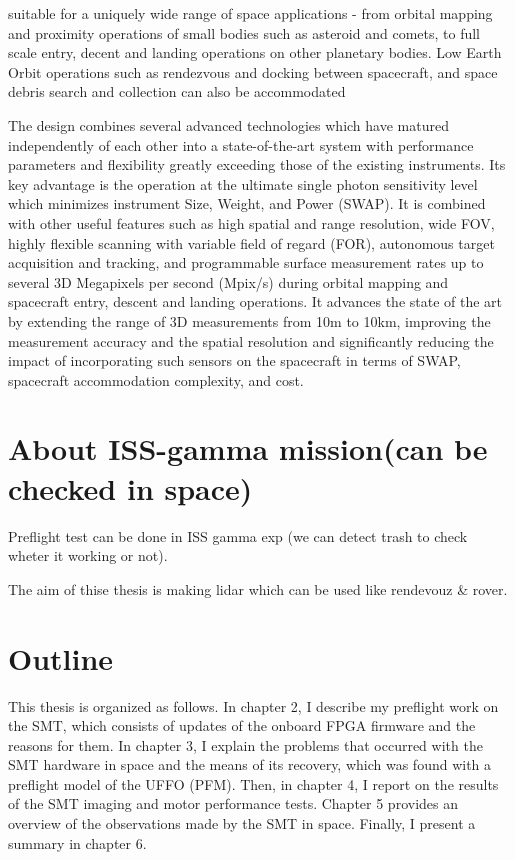 suitable for a uniquely wide range of space applications - from orbital mapping and proximity operations of small bodies such as asteroid and comets, to full scale entry, decent and landing operations on other planetary bodies. Low Earth Orbit operations such as rendezvous and docking between spacecraft, and space debris search and collection can also be accommodated

The design combines several advanced technologies which have matured independently of each other into a state-of-the-art system with performance parameters and flexibility greatly exceeding those of the existing instruments. Its key advantage is the operation at the ultimate single photon sensitivity level which minimizes instrument Size, Weight, and Power (SWAP). It is combined with other useful features such as high spatial and range resolution, wide FOV, highly flexible scanning with variable field of regard (FOR), autonomous target acquisition and tracking, and programmable surface measurement rates up to several 3D Megapixels per second (Mpix/s) during orbital mapping and spacecraft entry, descent and landing operations. It advances the state of the art by extending the range of 3D measurements from 10m to 10km, improving the measurement accuracy and the spatial resolution and significantly reducing the impact of incorporating such sensors on the spacecraft in terms of SWAP, spacecraft accommodation complexity, and cost.




\section{About ISS-gamma mission(can be checked in space)}
Preflight test can be done in ISS gamma exp (we can detect trash to check wheter it working or not).

The aim of thise thesis is making lidar which can be used like rendevouz \& rover.

\section{Outline}
This thesis is organized as follows. In chapter 2, I describe my preflight work on the SMT,
which consists of updates of the onboard FPGA firmware and the reasons for them. In chapter 3, I
explain the problems that occurred with the SMT hardware in space and the means of its recovery,
which was found with a preflight model of the UFFO (PFM). Then, in chapter 4, I report on the
results of the SMT imaging and motor performance tests. Chapter 5 provides an overview of the
observations made by the SMT in space. Finally, I present a summary in chapter 6.
